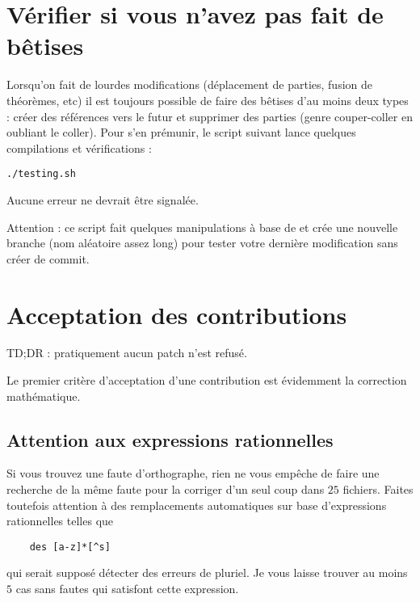 \section{Vérifier si vous n'avez pas fait de bêtises}

Lorsqu'on fait de lourdes modifications (déplacement de parties, fusion de théorèmes, etc) il est toujours possible de faire des bêtises d'au moins deux types : créer des références vers le futur et supprimer des parties (genre couper-coller en oubliant le coller). Pour s'en prémunir, le script suivant lance quelques compilations et vérifications :

\begin{verbatim}
./testing.sh
\end{verbatim}
Aucune erreur ne devrait être signalée.

Attention : ce script fait quelques manipulations à base de  et crée une nouvelle branche (nom aléatoire assez long) pour tester votre dernière modification sans créer de commit.

\section{Acceptation des contributions}

TD;DR : pratiquement aucun patch n'est refusé.

Le premier critère d'acceptation d'une contribution est évidemment la correction mathématique.

\subsection{Attention aux expressions rationnelles}

Si vous trouvez une faute d'orthographe, rien ne vous empêche de faire une recherche de la même faute pour la corriger d'un seul coup dans \( 25\) fichiers. Faites toutefois attention à des remplacements automatiques sur base d'expressions rationnelles telles que
\begin{verbatim}
    des [a-z]*[^s]
\end{verbatim}
qui serait supposé détecter des erreurs de pluriel. Je vous laisse trouver au moins \( 5\) cas sans fautes qui satisfont cette expression.

